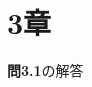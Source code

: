 \documentclass[11pt,dvipdfmx]{jreport}
\begin{document}
\section*{3章}

\par
\vspace{5mm}
\noindent \textbf{問3.1}の解答 
\par
\begin{comment}
スコーレム標準形を求める.
\begin{enumerate}
\renewcommand{\labelenumi}{\arabic{enumi}) }
 \item 
  \begin{equation*}
  \begin{array}{lll}
   &P(x) \supset (\exists y (\exists u Q(x,u) \supset R(y,z)) \lor S(x,y)) & \hspace{10mm} \mathrm{12)の右}  \\
   \sim \ & P(x) \supset (\exists y \forall u (Q(x,u) \supset R(y,z)) \lor S(x,y)) & \hspace{10mm} \mathrm{8)} \\
   \sim \ & P(x) \supset (\exists y \forall u (\lnot Q(x,u) \lor R(y,z)) \lor S(x,y)) & \hspace{10mm} \mathrm{8)} \\
   \sim \ & \lnot P(x) \lor (\exists y \forall u (Q(x,u) \supset R(y,z)) \lor S(x,y)) & \hspace{10mm} \mathrm{3)の右} \\
   \sim \ & \lnot P(x) \lor \exists y (\forall u (Q(x,u) \supset R(y,z)) \lor S(x,y)) & \hspace{10mm} \mathrm{4)の左} \\
   \sim \ &\lnot P(x) \lor \exists y (\forall u (Q(x,u) \supset R(y,z)) \lor S(x,y)) & \hspace{10mm} \mathrm{3)の左} \\
   \sim \ &\lnot P(x) \lor \exists y \forall u ((Q(x,u) \supset R(y,z)) \lor S(x,y))  & \hspace{10mm} \mathrm{4)の左} \\
   \sim \ & \exists y (\lnot P(x) \lor \forall u ((Q(x,u) \supset R(y,z)) \lor S(x,y)) & \hspace{10mm} \mathrm{4)の左} \\
   \sim \ & \exists y \forall u (\lnot P(x) \lor ((Q(x,u) \supset R(y,z)) \lor S(x,y)) & \\
  \end{array}
  \end{equation*}
$\forall u$の左側には，存在記号が一つ現れるので一変数関数記号fを導入して，\\
  \begin{equation*}
    \begin{array}{lll}
      & \exists y (\lnot P(x) \lor ((Q(x,f(y)) \supset R(y,z)) \lor S(x,y)) & 
    \end{array}
  \end{equation*}
\end{enumerate}
\end{comment}
\end{document}
